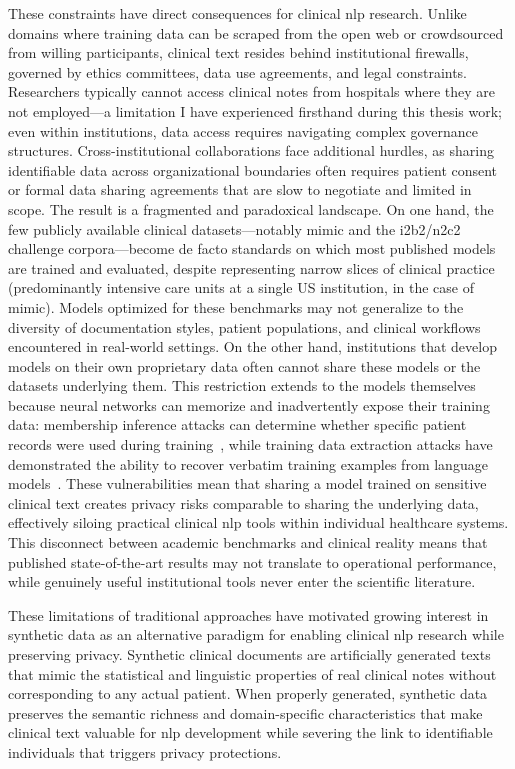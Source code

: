 These constraints have direct consequences for clinical \gls{nlp} research. Unlike domains where training data can be scraped from the open web or crowdsourced from willing participants, clinical text resides behind institutional firewalls, governed by ethics committees, data use agreements, and legal constraints. Researchers typically cannot access clinical notes from hospitals where they are not employed---a limitation I have experienced firsthand during this thesis work; even within institutions, data access requires navigating complex governance structures. Cross-institutional collaborations face additional hurdles, as sharing identifiable data across organizational boundaries often requires patient consent or formal data sharing agreements that are slow to negotiate and limited in scope. The result is a fragmented and paradoxical landscape. On one hand, the few publicly available clinical datasets---notably \gls{mimic} and the i2b2/n2c2 challenge corpora---become de facto standards on which most published models are trained and evaluated, despite representing narrow slices of clinical practice (predominantly intensive care units at a single US institution, in the case of \gls{mimic}). Models optimized for these benchmarks may not generalize to the diversity of documentation styles, patient populations, and clinical workflows encountered in real-world settings. On the other hand, institutions that develop models on their own proprietary data often cannot share these models or the datasets underlying them.
This restriction extends to the models themselves because neural networks can memorize and inadvertently expose their training data: membership inference attacks can determine whether specific patient records were used during training~\citep{shokri2017membership}, while training data extraction attacks have demonstrated the ability to recover verbatim training examples from language models~\citep{carlini2021extracting}.
These vulnerabilities mean that sharing a model trained on sensitive clinical text creates privacy risks comparable to sharing the underlying data, effectively siloing practical clinical \gls{nlp} tools within individual healthcare systems. This disconnect between academic benchmarks and clinical reality means that published state-of-the-art results may not translate to operational performance, while genuinely useful institutional tools never enter the scientific literature.

These limitations of traditional approaches have motivated growing interest in synthetic data as an alternative paradigm for enabling clinical \gls{nlp} research while preserving privacy. Synthetic clinical documents are artificially generated texts that mimic the statistical and linguistic properties of real clinical notes without corresponding to any actual patient. When properly generated, synthetic data preserves the semantic richness and domain-specific characteristics that make clinical text valuable for \gls{nlp} development while severing the link to identifiable individuals that triggers privacy protections.

